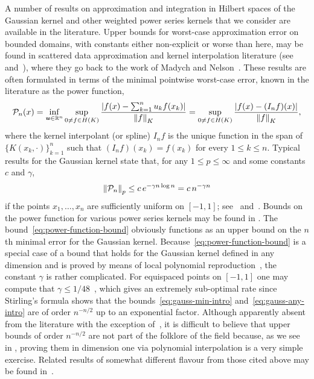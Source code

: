 \documentclass{mcom-l}
\numberwithin{equation}{section}
\numberwithin{theorem}{section} %
\renewcommand{\b}[1]{\bm{#1}}
\newcommand{\R}{\mathbb{R}} %
\begin{document}
A number of results on approximation and integration in Hilbert spaces of the Gaussian kernel and other weighted power series kernels that we consider are available in the literature.
Upper bounds for worst-case approximation error on bounded domains, with constants either non-explicit or worse than here, may be found in scattered data approximation and kernel interpolation literature (see~\cite[Sec.\@~11.4]{Wendland2005} and~\cite{Zwicknagl2009, RiegerZwicknagl2010, ZwicknaglSchaback2013, RiegerZwicknagl2014, KarvonenTanaka2021}), where they go back to the work of Madych and Nelson~\cite{MadychNelson1992}.
These results are often formulated in terms of the minimal pointwise worst-case error, known in the literature as the power function,
\begin{equation*}
  \begin{split}
    \mathcal{P}_{n}(x) = \inf_{\b{u} \in \R^n} \sup_{ 0 \neq f \in H(K)} \frac{\abs[0]{f(x) - \sum_{k=1}^n u_k f(x_k) }}{\norm[0]{f}_K} = \sup_{ 0 \neq f \in H(K)} \frac{\abs[0]{f(x) - (I_{n} f)(x) }}{\norm[0]{f}_K},
    \end{split}
\end{equation*}
where the kernel interpolant (or spline) $I_{n} f$ is the unique function in the span of $\{K(x_k, \cdot)\}_{k=1}^n$ such that $(I_{n} f)(x_k) = f(x_k)$ for every $1 \leq k \leq n$.
Typical results for the Gaussian kernel state that, for any $1 \leq p \leq \infty$ and some constants $c$ and $\gamma$,
\begin{equation} \label{eq:power-function-bound}
  \norm[0]{\mathcal{P}_{n}}_p \leq c \, e^{- \gamma n \log n} = c \, n^{- \gamma n}
\end{equation}
if the points $x_1, \ldots, x_n$ are sufficiently uniform on $[-1, 1]$; see~\cite[Thm.\@~11.22]{Wendland2005} and~\cite[Thm.\@~6.1]{RiegerZwicknagl2010}.
Bounds on the power function for various power series kernels may be found in \cite{Zwicknagl2009, ZwicknaglSchaback2013}.
The bound~\eqref{eq:power-function-bound} obviously functions as an upper bound on the $n$th minimal error for the Gaussian kernel.
Because~\eqref{eq:power-function-bound} is a special case of a bound that holds for the Gaussian kernel defined in any dimension and is proved by means of local polynomial reproduction~\cite[Ch.\@~3]{Wendland2005}, the constant $\gamma$ is rather complicated.
For equispaced points on $[-1, 1]$ one may compute that $\gamma \leq 1/48$~\cite[Sec.\@~4.2]{KarvonenTanaka2021}, which gives an extremely sub-optimal rate since Stirling's formula shows that the bounds~\eqref{eq:gauss-min-intro} and~\eqref{eq:gauss-any-intro} are of order $n^{-n/2}$ up to an exponential factor.
Although apparently absent from the literature with the exception of~\cite{KarvonenTanaka2021}, it is difficult to believe that upper bounds of order $n^{-n/2}$ are not part of the folklore of the field because, as we see in , proving them in dimension one via polynomial interpolation is a very simple exercise.
Related results of somewhat different flavour from those cited above may be found in~\cite{PlatteDriscoll2005, Platte2011}.
\end{document}
